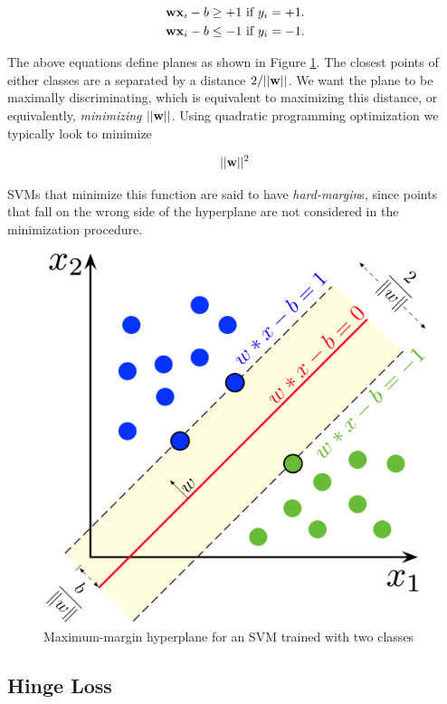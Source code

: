 \begin{align}
	\textbf{wx}_i-b &\ge +1 ~\textrm{if}~ y_i = +1.  \label{svm_planes_pos}\\
	\textbf{wx}_i-b &\le -1 ~\textrm{if}~ y_i = -1.  \label{svm_planes_neg}
\end{align}

The above equations define planes as shown in Figure \ref{fig:svm}. The closest points of either classes are a separated by a distance $2/ ||\textbf{w}||$. We want the plane to be maximally discriminating, which is equivalent to maximizing this distance, or equivalently, \emph{minimizing} $||\textbf{w}||$. Using quadratic programming optimization we typically look to minimize \cite{burkov}


\begin{align}\label{svm_loss}
||\textbf{w}||^2
\end{align}

SVMs that minimize this function are said to have \emph{hard-margin}s, since points that fall on the wrong side of the hyperplane are not considered in the minimization procedure. 

\begin{figure}
\centerline{\includegraphics[width=0.5\linewidth]{mathematics/fig/svm.png}}
\caption{Maximum-margin hyperplane for an SVM trained with two classes \cite{wiki_svm}}
\label{fig:svm}
\end{figure}

\subsection{Hinge Loss}

